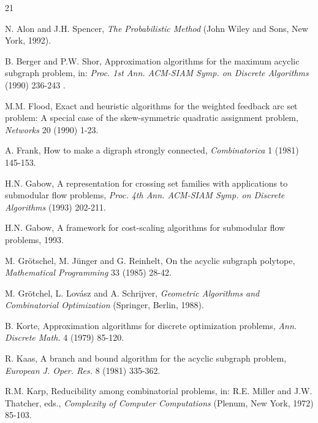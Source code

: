 
\renewcommand\refname{Литература}
\makeatother

{\small

  \begin{thebibliography} {21}

    N. Alon and J.H. Spencer, \textit{The Probabilistic Method} (John Wiley and Sons, New York, 1992).

    B. Berger and P.W. Shor, Approximation algorithms for the maximum acyclic subgraph problem, in: \textit{Proc.
      1st Ann. ACM-SIAM Symp. on Discrete Algorithms} (1990) 236-243 .

    M.M. Flood, Exact and heuristic algorithms for the weighted feedback arc set problem: A special case of the skew-symmetric quadratic assignment problem, \textit{Networks} 20 (1990) 1-23.

    A. Frank, How to make a digraph strongly connected, \textit{Combinatorica} 1 (1981) 145-153.

    H.N. Gabow, A representation for crossing set families with applications to submodular flow problems, \textit{Proc. 4th Ann. ACM-SIAM Symp. on Discrete Algorithms} (1993) 202-211.

    H.N. Gabow, A framework for cost-scaling algorithms for submodular flow problems, 1993.

    M. Grötschel, M. Jünger and G. Reinhelt, On the acyclic subgraph polytope, \textit{Mathematical Programming} 33 (1985) 28-42.

    M. Grötchel, L. Lovász and A. Schrijver, \textit{Geometric Algorithms and Combinatorial Optimization} (Springer, Berlin, 1988).

    B. Korte, Approximation algorithms for discrete optimization problems, \textit{Ann. Discrete Math.} 4 (1979) 85-120.

     R. Kaas, A branch and bound algorithm for the acyclic subgraph problem, \textit{European J. Oper. Res.} 8 (1981) 335-362.

     R.M. Karp, Reducibility among combinatorial problems, in: R.E. Miller and J.W. Thatcher, eds.,
    \textit{Complexity of Computer Computations} (Plenum, New
    York, 1972) 85-103.


\end{thebibliography}}
